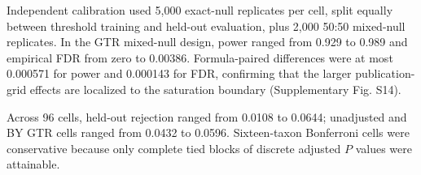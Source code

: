 Independent calibration used 5,000 exact-null replicates per cell, split equally between threshold training and held-out evaluation, plus 2,000 50:50 mixed-null replicates. In the GTR mixed-null design, power ranged from 0.929 to 0.989 and empirical FDR from zero to 0.00386. Formula-paired differences were at most 0.000571 for power and 0.000143 for FDR, confirming that the larger publication-grid effects are localized to the saturation boundary (Supplementary Fig. S14).

Across 96 cells, held-out rejection ranged from 0.0108 to 0.0644; unadjusted and BY GTR cells ranged from 0.0432 to 0.0596. Sixteen-taxon Bonferroni cells were conservative because only complete tied blocks of discrete adjusted \(P\) values were attainable.
